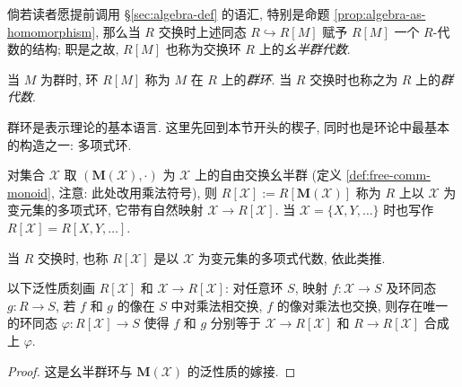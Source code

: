 倘若读者愿提前调用 \S\ref{sec:algebra-def} 的语汇, 特别是命题 \ref{prop:algebra-as-homomorphism}, 那么当 $R$ 交换时上述同态 $R \hookrightarrow R[M]$ 赋予 $R[M]$ 一个 $R$-代数的结构; 职是之故, $R[M]$ 也称为交换环 $R$ 上的\emph{幺半群代数}.

\begin{definition}\label{def:group-ring}
	当 $M$ 为群时, 环 $R[M]$ 称为 $M$ 在 $R$ 上的\emph{群环}. 当 $R$ 交换时也称之为 $R$ 上的\emph{群代数}.
\end{definition}

群环是表示理论的基本语言. 这里先回到本节开头的楔子, 同时也是环论中最基本的构造之一: 多项式环.
\begin{definition}[多项式环] 
	对集合 $\mathcal{X}$ 取 $(\mathbf{M}(\mathcal{X}), \cdot)$ 为 $\mathcal{X}$ 上的自由交换幺半群 (定义 \ref{def:free-comm-monoid}, 注意: 此处改用乘法符号), 则 $R[\mathcal{X}] := R[\mathbf{M}(\mathcal{X})]$ 称为 $R$ 上以 $\mathcal{X}$ 为变元集的多项式环, 它带有自然映射 $\mathcal{X} \to R[\mathcal{X}]$. 当 $\mathcal{X} = \{X, Y, \ldots\}$ 时也写作 $R[\mathcal{X}] = R[X, Y, \ldots]$.
\end{definition}
当 $R$ 交换时, 也称 $R[\mathcal{X}]$ 是以 $\mathcal{X}$ 为变元集的多项式代数, 依此类推.

\begin{proposition}\label{prop:polynomial-ring-universal}
	以下泛性质刻画 $R[\mathcal{X}]$ 和 $\mathcal{X} \to R[\mathcal{X}]$: 对任意环 $S$, 映射 $f: \mathcal{X} \to S$ 及环同态 $g: R \to S$, 若 $f$ 和 $g$ 的像在 $S$ 中对乘法相交换, $f$ 的像对乘法也交换, 则存在唯一的环同态 $\varphi: R[\mathcal{X}] \to S$ 使得 $f$ 和 $g$ 分别等于 $\mathcal{X} \to R[\mathcal{X}]$ 和 $R \to R[\mathcal{X}]$ 合成上 $\varphi$.
\end{proposition}
\begin{proof}
	这是幺半群环与 $\mathbf{M}(\mathcal{X})$ 的泛性质的嫁接.
\end{proof}

